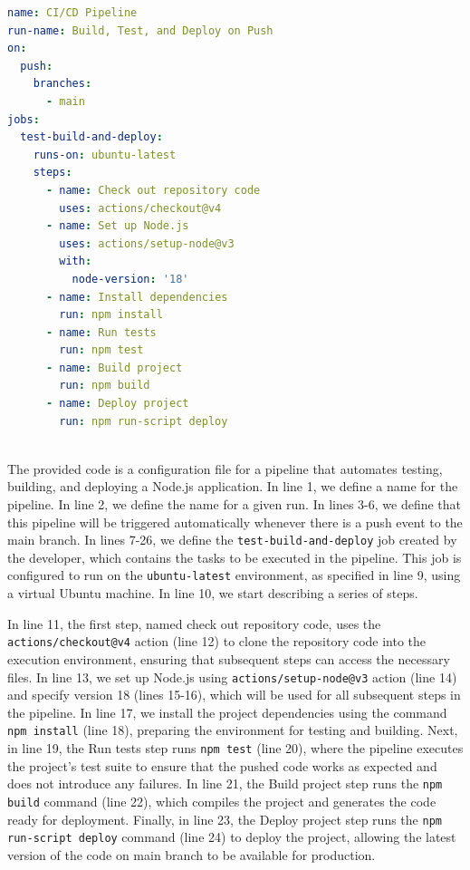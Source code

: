 \documentclass[
	msc, %
	english %
]{../ppgccufmg}
\begin{document}
        \begin{lstlisting}[language=yaml, caption=GitHub Actions workflow example, label=lst:example-wkflow]
name: CI/CD Pipeline
run-name: Build, Test, and Deploy on Push
on:
  push:
    branches:
      - main
jobs:
  test-build-and-deploy:
    runs-on: ubuntu-latest
    steps:
      - name: Check out repository code
        uses: actions/checkout@v4
      - name: Set up Node.js
        uses: actions/setup-node@v3
        with:
          node-version: '18'  
      - name: Install dependencies
        run: npm install
      - name: Run tests
        run: npm test
      - name: Build project
        run: npm build
      - name: Deploy project
        run: npm run-script deploy
\end{lstlisting} 
~\\[-2.0pt]

The provided code is a configuration file for a pipeline that automates testing, building, and deploying a Node.js application. In line 1, we define a name for the pipeline. In line 2, we define the name for a given run. In lines 3-6, we define that this pipeline will be triggered automatically whenever there is a push event to the main branch. In lines 7-26, we define the \texttt{test-build-and-deploy} job created by the developer, which contains the tasks to be executed in the pipeline. This job is configured to run on the \texttt{ubuntu-latest} environment, as specified in line 9, using a virtual Ubuntu machine. In line 10, we start describing a series of steps.

In line 11, the first step, named check out repository code, uses the \texttt{actions/check\-out@v4} action (line 12) to clone the repository code into the execution environment, ensuring that subsequent steps can access the necessary files. In line 13, we set up Node.js using \texttt{actions/set\-up-node@v3} action (line 14) and specify version 18 (lines 15-16), which will be used for all subsequent steps in the pipeline. In line 17, we install the project dependencies using the command \texttt{npm install} (line 18), preparing the environment for testing and building. Next, in line 19, the Run tests step runs \texttt{npm test} (line 20), where the pipeline executes the project’s test suite to ensure that the pushed code works as expected and does not introduce any failures. In line 21, the Build project step runs the \texttt{npm build} command (line 22), which compiles the project and generates the code ready for deployment. Finally, in line 23, the Deploy project step runs the \texttt{npm run-script deploy} command (line 24) to deploy the project, allowing the latest version of the code on main branch to be available for production. 
\end{document}
